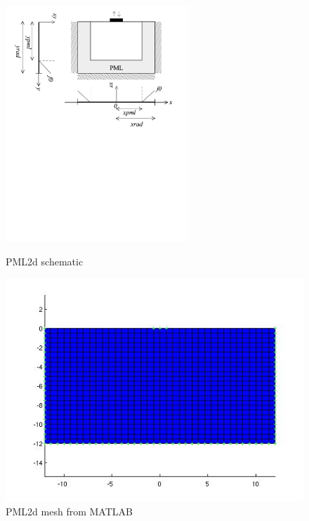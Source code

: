 \begin{figure}[htbp]
  \centering
  \includegraphics[trim = 0in 5in 0in 0in, clip, height=3.5in]{fig/2dpml.pdf}
  \caption{PML2d schematic}
  \label{fig:PML2dSchematic}
  \begin{minipage}{0.45\linewidth}
    \includegraphics[width=\linewidth]{fig/pml2d_mesh_matlab.jpg}
    \caption{PML2d mesh from MATLAB}
    \label{fig:PML2dMeshMATLAB}
  \end{minipage}
  \hfill
  \begin{minipage}{0.45\linewidth}

\end{minipage}
\end{figure}
